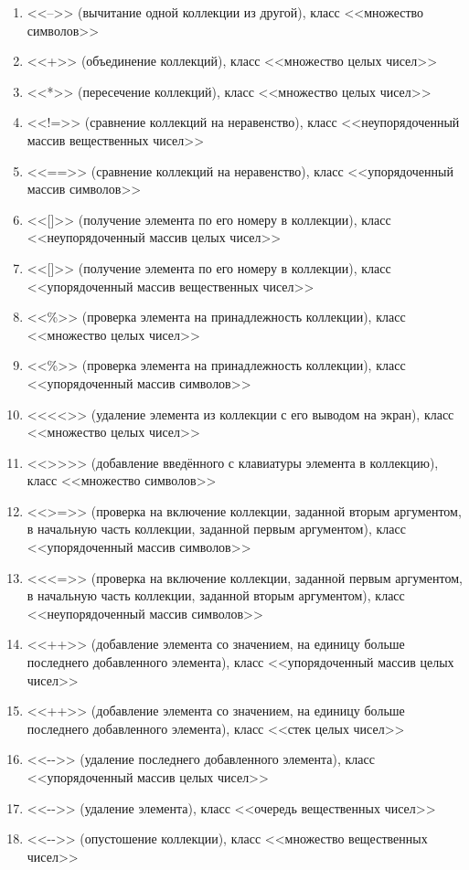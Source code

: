 \begin{enumerate}
\item <<–>> (вычитание одной коллекции из другой), класс <<множество символов>>
\item <<+>> (объединение коллекций), класс <<множество целых чисел>>
\item <<*>> (пересечение коллекций), класс <<множество целых чисел>>
\item <<!=>> (сравнение коллекций на неравенство), класс <<неупорядоченный массив вещественных чисел>>
\item <<==>> (сравнение коллекций на неравенство), класс <<упорядоченный массив символов>>
\item <<[]>> (получение элемента по его номеру в коллекции), класс <<неупорядоченный массив целых чисел>>
\item <<[]>> (получение элемента по его номеру в коллекции), класс <<упорядоченный массив вещественных чисел>>
\item <<\%>> (проверка элемента на принадлежность коллекции), класс <<множество целых чисел>>
\item <<\%>> (проверка элемента на принадлежность коллекции), класс <<упорядоченный массив символов>>
\item <<{<}{<}>> (удаление элемента из коллекции с его выводом на экран), класс <<множество целых чисел>>
\item <<{>}{>}>>  (добавление введённого с клавиатуры элемента в коллекцию), класс <<множество
символов>>
\item <<{>}=>> (проверка на включение коллекции, заданной вторым аргументом, в начальную часть коллекции,
заданной первым аргументом), класс <<упорядоченный массив символов>>
\item <<{<}=>> (проверка на включение коллекции, заданной первым аргументом, в начальную часть коллекции, заданной
вторым аргументом), класс <<неупорядоченный массив символов>>
\item <<++>> (добавление элемента со значением, на единицу больше последнего добавленного элемента), класс <<упорядоченный
массив целых чисел>>
\item <<++>> (добавление элемента со значением, на единицу больше последнего добавленного элемента), класс <<стек целых
чисел>>
\item <<-{}->> (удаление последнего добавленного элемента), класс <<упорядоченный массив целых чисел>>
\item <<-{}->> (удаление элемента), класс <<очередь вещественных чисел>>
\item <<-{}->> (опустошение коллекции), класс <<множество вещественных чисел>>

\end{enumerate}
